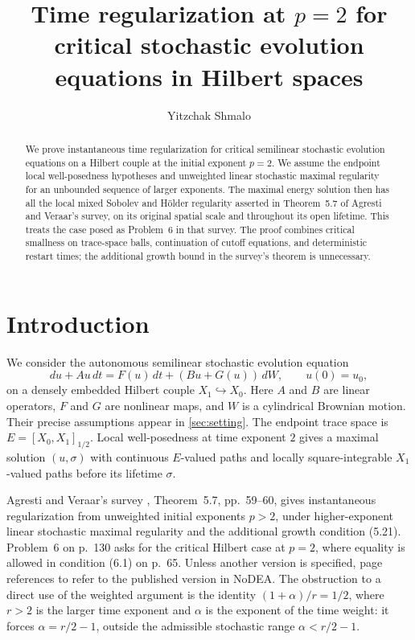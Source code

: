 \documentclass[11pt]{amsart}
\title[Time regularization at $p=2$]{Time regularization at $p=2$ for critical stochastic evolution equations in Hilbert spaces}
\author{Yitzchak Shmalo}
\date{}
\theoremstyle{definition}
\theoremstyle{remark}
\numberwithin{equation}{section}
\begin{document}
\begin{abstract}
We prove instantaneous time regularization for critical semilinear stochastic
evolution equations on a Hilbert couple at the initial exponent $p=2$.
We assume the endpoint local well-posedness hypotheses and unweighted linear
stochastic maximal regularity for an unbounded sequence of larger exponents.
The maximal energy solution then has all the local mixed Sobolev and H\"older
regularity asserted in Theorem~5.7 of Agresti and Veraar's survey, on its
original spatial scale and throughout its open lifetime. This treats the case
posed as Problem~6 in that survey. The proof combines critical smallness on
trace-space balls, continuation of cutoff equations, and deterministic
restart times; the additional growth bound in the survey's theorem is unnecessary.
\end{abstract}
\maketitle

\section{Introduction}

We consider the autonomous semilinear stochastic evolution equation
\begin{equation}\label{eq:equation}
 du+Au\,dt=F(u)\,dt+(Bu+G(u))\,dW,\qquad u(0)=u_0,
\end{equation}
on a densely embedded Hilbert couple $X_1\hookrightarrow X_0$. Here $A$ and
$B$ are linear operators, $F$ and $G$ are nonlinear maps, and $W$ is a
cylindrical Brownian motion. Their precise assumptions appear in
\cref{sec:setting}. The endpoint trace space is $E=[X_0,X_1]_{1/2}$.
Local well-posedness at time exponent $2$ gives a maximal solution $(u,\sigma)$
with continuous $E$-valued paths and locally square-integrable $X_1$-valued
paths before its lifetime $\sigma$.

Agresti and Veraar's survey \cite{Survey}, Theorem~5.7, pp.~59--60, gives
instantaneous regularization from unweighted initial exponents $p>2$, under
higher-exponent linear stochastic maximal regularity and the additional
growth condition (5.21). Problem~6 on p.~130 asks for the critical Hilbert
case at $p=2$, where equality is allowed in condition (6.1) on p.~65.
Unless another version is specified, page references to \cite{Survey}
refer to the published version in NoDEA.
The obstruction to a direct use of the weighted argument is the identity
$(1+\alpha)/r=1/2$, where $r>2$ is the larger time exponent and
$\alpha$ is the exponent of the time weight: it forces $\alpha=r/2-1$, outside the
admissible stochastic range $\alpha<r/2-1$.
\end{document}
